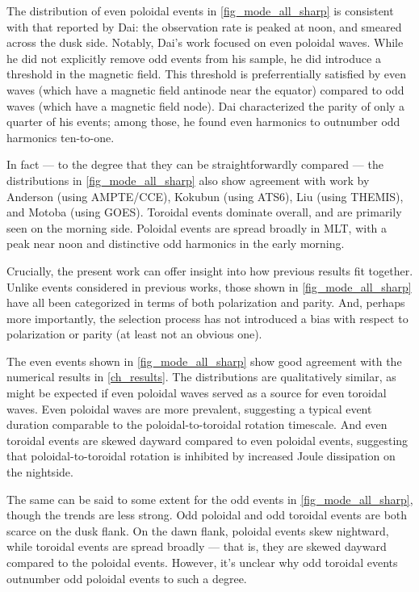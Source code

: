 The distribution of even poloidal events in \cref{fig_mode_all_sharp} is consistent with that reported by Dai\cite{dai_2015}: the observation rate is peaked at noon, and smeared across the dusk side. Notably, Dai's work focused on even poloidal waves. While he did not explicitly remove odd events from his sample, he did introduce a threshold in the magnetic field. This threshold is preferrentially satisfied by even waves (which have a magnetic field antinode near the equator) compared to odd waves (which have a magnetic field node). Dai characterized the parity of only a quarter of his events; among those, he found even harmonics to outnumber odd harmonics ten-to-one. 

In fact --- to the degree that they can be straightforwardly compared --- the distributions in \cref{fig_mode_all_sharp} also show agreement with work by Anderson\cite{anderson_1990} (using AMPTE/CCE), Kokubun\cite{kokubun_1989} (using ATS6), Liu\cite{liu_2009} (using THEMIS), and Motoba\cite{motoba_2015} (using GOES). Toroidal events dominate overall, and are primarily seen on the morning side. Poloidal events are spread broadly in MLT, with a peak near noon and distinctive odd harmonics in the early morning. 

Crucially, the present work can offer insight into how previous results fit together. Unlike events considered in previous works, those shown in \cref{fig_mode_all_sharp} have all been categorized in terms of both polarization and parity. And, perhaps more importantly, the selection process has not introduced a bias with respect to polarization or parity (at least not an obvious one). 

The even events shown in \cref{fig_mode_all_sharp} show good agreement with the numerical results in \cref{ch_results}. The distributions are qualitatively similar, as might be expected if even poloidal waves served as a source for even toroidal waves. Even poloidal waves are more prevalent, suggesting a typical event duration comparable to the poloidal-to-toroidal rotation timescale. And even toroidal events are skewed dayward compared to even poloidal events, suggesting that poloidal-to-toroidal rotation is inhibited by increased Joule dissipation on the nightside. 

The same can be said to some extent for the odd events in \cref{fig_mode_all_sharp}, though the trends are less strong. Odd poloidal and odd toroidal events are both scarce on the dusk flank. On the dawn flank, poloidal events skew nightward, while toroidal events are spread broadly --- that is, they are skewed dayward compared to the poloidal events. However, it's unclear why odd toroidal events outnumber odd poloidal events to such a degree. 

